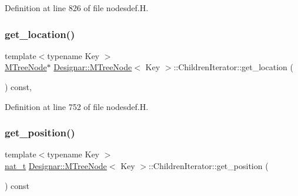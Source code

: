 Definition at line 826 of file nodesdef.\+H.

\mbox{\label{class_designar_1_1_m_tree_node_1_1_children_iterator_a59d7d79081ab145a9ab886ee4873ae57}} 
\subsubsection{\texorpdfstring{get\+\_\+location()}{get\_location()}}
{\footnotesize\ttfamily template$<$typename Key $>$ \\
\hyperlink{class_designar_1_1_m_tree_node}{M\+Tree\+Node}$\ast$ \hyperlink{class_designar_1_1_m_tree_node}{Designar\+::\+M\+Tree\+Node}$<$ Key $>$\+::Children\+Iterator\+::get\+\_\+location (\begin{DoxyParamCaption}{ }\end{DoxyParamCaption}) const\hspace{0.3cm}{\ttfamily [inline]}, {\ttfamily [protected]}}



Definition at line 752 of file nodesdef.\+H.

\mbox{\label{class_designar_1_1_m_tree_node_1_1_children_iterator_a0e1a9070e700ca1dbdbc5c588193dd54}} 
\subsubsection{\texorpdfstring{get\+\_\+position()}{get\_position()}}
{\footnotesize\ttfamily template$<$typename Key $>$ \\
\hyperlink{namespace_designar_aa72662848b9f4815e7bf31a7cf3e33d1}{nat\+\_\+t} \hyperlink{class_designar_1_1_m_tree_node}{Designar\+::\+M\+Tree\+Node}$<$ Key $>$\+::Children\+Iterator\+::get\+\_\+position (\begin{DoxyParamCaption}{ }\end{DoxyParamCaption}) const\hspace{0.3cm}{\ttfamily [inline]}}



